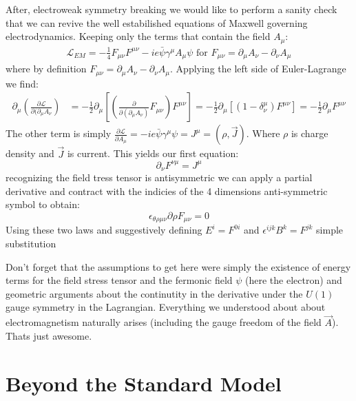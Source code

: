 After, electroweak symmetry breaking we would like to perform a sanity check that we can revive the well estabilished equations of
Maxwell governing electrodynamics. 
Keeping only the terms that contain the field $A_\mu$:
\begin{align*}
\mathcal{L}_{EM} = -\frac{1}{4} F_{\mu\nu} F^{\mu\nu}  - ie \bar{\psi} \gamma^\mu A_\mu \psi \text{ for } F_{\mu\nu} = \partial_\mu A_\nu - \partial_\nu A_\mu 
\end{align*}
where by definition $F_{\mu\nu} = \partial_\mu A_\nu - \partial_\nu A_\mu$. Applying the left side of Euler-Lagrange we find:
\begin{align*}
\partial_\mu \left (\frac{\partial \mathcal L}{\partial(\partial_\mu A_\nu} \right) &=  
-\frac{1}{2}\partial_\mu \left [ \left (\frac{\partial}{\partial(\partial_\mu A_\nu)} F_{\mu\nu} \right) F^{\mu\nu} \right ] 
= - \frac{1}{2} \partial_\mu \left [(1 - \delta^\mu_\nu) F^{\mu\nu} \right ]
= - \frac{1}{2} \partial_\mu F^{\mu\nu}
\end{align*}
The other term is simply $\frac{\partial \mathcal L}{\partial A_\mu} = -ie \bar \psi \gamma^\mu  \psi = J^\mu = (\rho, \vec J)$. Where $\rho$ is charge
density and $\vec J$ is current. This yields our first equation:
\begin{equation}
\partial_\nu F^{\nu\mu} = J^\mu
\end{equation}
recognizing the field tress tensor is antisymmetric we can apply a partial derivative and contract with the indicies of the 4 dimensions anti-symmetric symbol
to obtain:
\begin{equation}
\epsilon_{\theta\rho\mu\nu} \partial{\rho} F_{\mu\nu} = 0 
\end{equation}
Using these two laws and suggestively defining $E^i = F^{0i}$ and $\epsilon^{ijk}B^k = F^{jk}$  simple substitution 

Don't forget that the assumptions to get here were simply the existence of energy terms for the field stress tensor 
and the fermonic field $\psi$ (here the electron) and geometric arguments about the continutity in the derivative 
under the $U(1)$ gauge symmetry in the Lagrangian. Everything we understood about about electromagnetism naturally 
arises (including the gauge freedom of the field $\vec A$). Thats just awesome. 





\section{Beyond the Standard Model}

